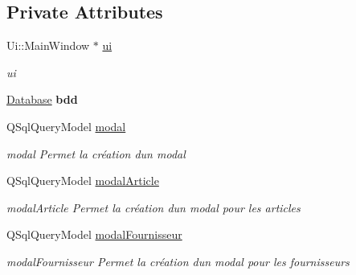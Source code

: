 \subsection*{Private Attributes}
\begin{DoxyCompactItemize}
\item 
\mbox{\label{class_main_window_a35466a70ed47252a0191168126a352a5}} 
Ui\+::\+Main\+Window $\ast$ \mbox{\hyperlink{class_main_window_a35466a70ed47252a0191168126a352a5}{ui}}
\begin{DoxyCompactList}\small\item\em ui \end{DoxyCompactList}\item 
\mbox{\label{class_main_window_a078ae22635b52ad72e713875fbef3403}} 
\mbox{\hyperlink{class_database}{Database}} {\bfseries bdd}
\item 
\mbox{\label{class_main_window_ab0a4abc1aa71b1d03de93edffeabb993}} 
Q\+Sql\+Query\+Model \mbox{\hyperlink{class_main_window_ab0a4abc1aa71b1d03de93edffeabb993}{modal}}
\begin{DoxyCompactList}\small\item\em modal Permet la création d\textquotesingle{}un modal \end{DoxyCompactList}\item 
\mbox{\label{class_main_window_a31dd2cf5140a6482aeb3d23b7131e3c8}} 
Q\+Sql\+Query\+Model \mbox{\hyperlink{class_main_window_a31dd2cf5140a6482aeb3d23b7131e3c8}{modal\+Article}}
\begin{DoxyCompactList}\small\item\em modal\+Article Permet la création d\textquotesingle{}un modal pour les articles \end{DoxyCompactList}\item 
\mbox{\label{class_main_window_a5115743b43273792e16c18b88c53cae8}} 
Q\+Sql\+Query\+Model \mbox{\hyperlink{class_main_window_a5115743b43273792e16c18b88c53cae8}{modal\+Fournisseur}}
\begin{DoxyCompactList}\small\item\em modal\+Fournisseur Permet la création d\textquotesingle{}un modal pour les fournisseurs \end{DoxyCompactList}\item 

\end{DoxyCompactItemize}
